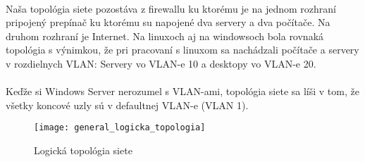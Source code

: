 \paragraph{}
Naša topológia siete pozostáva z firewallu ku ktorému je na jednom rozhraní pripojený prepínač ku ktorému su napojené dva servery a dva počítače. Na druhom rozhraní je Internet. Na linuxoch aj na windowsoch bola rovnaká topológia s výnimkou, že pri pracovaní s linuxom sa nachádzali počítače a servery v rozdielnych VLAN: Servery vo VLAN-e 10 a desktopy vo VLAN-e 20.
\paragraph{}
Keďže si Windows Server nerozumel s VLAN-ami, topológia siete sa líši v tom, že všetky koncové uzly sú v defaultnej VLAN-e (VLAN 1).

\begin{figure}[h]
\centering
\texttt{[image: general\_logicka\_topologia]}
\caption{Logická topológia siete}
\label{fig:log_topologia}
\end{figure}
